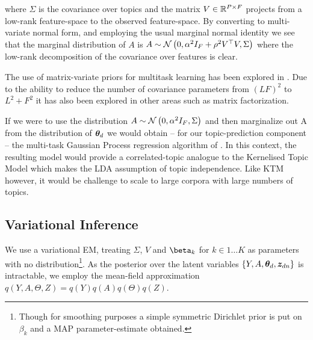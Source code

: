 where $\Sigma$ is the covariance over topics and the matrix $V \in { \mathbb{R}^{P \times F} }$ projects from a low-rank feature-space to the observed feature-space. By converting to multi-variate normal form, and employing the usual marginal normal identity\cite{Bishop2006}  we see that the marginal distribution of $A$ is
$ A \sim \mathcal{N} \left(0, \alpha^2 I_F + \rho^2 V^\top V, \Sigma\right)$ where the low-rank decomposition of the covariance over features is clear. 

The use of matrix-variate priors for multitask learning has been explored in \cite{Stegle2011}\cite{Bonilla2008} \cite{Archambeau2011}\cite{Yang2011}. Due to the ability to reduce the number of covariance parameters from $(LF)^2$ to $L^2 + F^2$ it has also been explored in other areas such as matrix factorization\cite{Allen2010}.

If we were to use the distribution $A \sim \mathcal{N} \left(0, \alpha^2 I_F, \Sigma\right)$ and then marginalize out A from the distribution of ${ \bm \theta_d }$ we would obtain -- for our topic-prediction component -- the multi-task Gaussian Process regression algorithm of \cite{Bonilla2008}. In this context, the resulting model would provide a correlated-topic analogue to the Kernelised Topic Model \cite{Hennig2012} which makes the LDA assumption of topic independence. Like KTM however, it would be challenge to scale to large corpora with large numbers of topics.

\subsection{Variational Inference}
\newcommand \onek { \one_K }
\newcommand \md { \vv{m}_d }
\newcommand \Vd { V^{(d)} }


\newcommand \sigmoid[1] { {  \vv{\sigma}\left( #1 \right)  } }
\newcommand \sigmoidk[1] { {  \sigmoidat{#1}{k}  } }
\newcommand \sigmoidat[2] { {  \sigma_{#2}\left( #1 \right)  } }
\newcommand \ged { { \nabla_{\Ed} } }
\newcommand \gesig { { \ged \left[ \sigmoid{\Ed} \right] } }

We use a variational EM, treating $\Sigma$, $V$ and $\vv{\beta}_k$ for $k \in 1\ldots K$ as parameters with no distribution\footnote{Though for smoothing purposes a simple symmetric Dirichlet prior is put on $\beta_k$ and a MAP parameter-estimate obtained.}. As the posterior over the latent variables $\{Y, A, { \bm \theta_d }, { \bm z_{dn} }\}$ is intractable, we employ the mean-field approximation $q(Y, A, \Theta, Z) = q(Y)q(A)q(\Theta)q(Z)$. 

